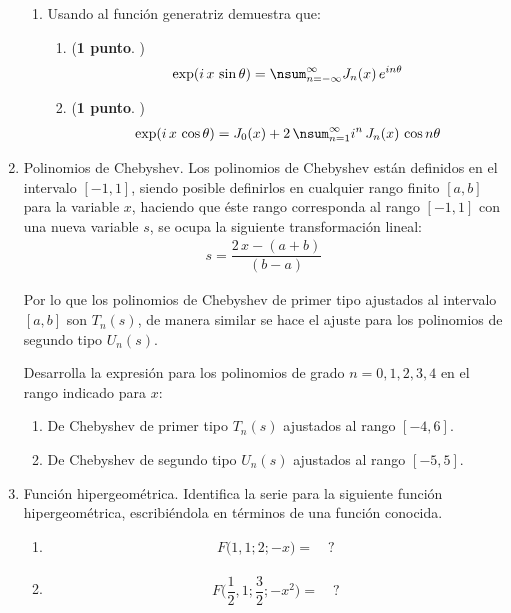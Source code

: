 \begin{enumerate}
\begin{enumerate}
\item Usando al función generatriz demuestra que:
\begin{enumerate}
\item (\textbf{1 punto}. )
\begin{align*}
\exp(i \, x \, \sin \theta) = \nsum_{n=-\infty}^{\infty} J_{n}(x) \, e^{i n \theta}
\end{align*}
\item (\textbf{1 punto}. )
\begin{align*}
\exp(i \, x \, \cos \theta) = J_{0} (x) + 2 \, \nsum_{n=1}^{\infty} i^{n} \, J_{n}(x) \, \cos n \theta
\end{align*}
\end{enumerate}
\end{enumerate}


\item Polinomios de Chebyshev. Los polinomios de Chebyshev están definidos en el intervalo $[- 1, 1]$, siendo posible definirlos en cualquier rango finito $[a, b]$ para la variable $x$, haciendo que éste rango corresponda al rango $[-1, 1]$ con una nueva variable $s$, se ocupa la siguiente transformación lineal:
\begin{align*}
s = \dfrac{2 \, x - (a + b)}{(b - a)}
\end{align*}

Por lo que los polinomios de Chebyshev de primer tipo ajustados al intervalo $[a, b]$ son $T_{n}(s)$, de manera similar se hace el ajuste para los polinomios de segundo tipo  $U_{n} (s)$. 
\noindent
\par
Desarrolla la expresión para los polinomios de grado $n = 0, 1, 2, 3, 4$ en el rango indicado para $x$:
\begin{enumerate}
\item De Chebyshev de primer tipo $T_{n} (s)$   ajustados al rango $[-4, 6]$.
\item De Chebyshev de segundo tipo $U_{n} (s)$   ajustados al rango $[-5, 5]$.
\end{enumerate}
\item Función hipergeométrica. Identifica la serie para la siguiente función hipergeométrica, escribiéndola en términos de una función conocida.
\begin{enumerate}
\item 
\begin{align*}
F \big( 1, 1; 2; - x \big) = \quad ?
\end{align*}
\item 
\begin{align*}
F \bigg( \dfrac{1}{2}, 1; \dfrac{3}{2}; - x^{2} \bigg) = \quad ?
\end{align*}

\end{enumerate}
\end{enumerate}


